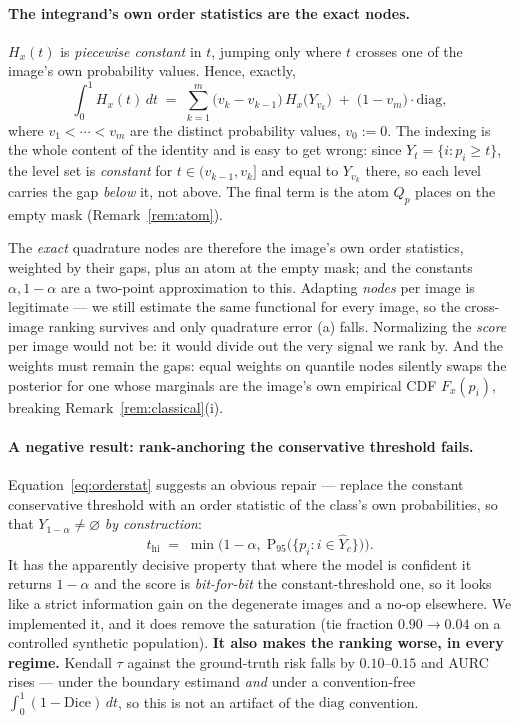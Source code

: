 \documentclass[11pt]{article}
\theoremstyle{remark}
\newcommand{\Yhat}{\widehat{Y}}
\newcommand{\Yhi}{Y_{1-\alpha}}
\newcommand{\Dice}{\mathrm{Dice}}
\newcommand{\diag}{\mathrm{diag}}
\begin{document}
\paragraph{The integrand's own order statistics are the exact nodes.} $H_x(t)$ is
\emph{piecewise constant} in $t$, jumping only where $t$ crosses one of the image's
own probability values. Hence, exactly,
\begin{equation}\label{eq:orderstat}
\int_0^1 H_x(t)\,dt \;=\; \sum_{k=1}^{m} \big(v_k - v_{k-1}\big)\, H_x\big(Y_{v_k}\big)
\;+\; \big(1 - v_m\big)\cdot \diag,
\end{equation}
where $v_1 < \cdots < v_m$ are the distinct probability values, $v_0 := 0$. The
indexing is the whole content of the identity and is easy to get wrong: since
$Y_t = \{i : p_i \ge t\}$, the level set is \emph{constant} for
$t \in (v_{k-1}, v_k]$ and equal to $Y_{v_k}$ there, so each level carries the gap
\emph{below} it, not above. The final term is the atom $Q_p$ places on the empty mask
(Remark~\ref{rem:atom}).

The \emph{exact} quadrature nodes are therefore the image's own order statistics,
weighted by their gaps, plus an atom at the empty mask; and the constants
$\alpha, 1-\alpha$ are a two-point approximation to this. Adapting \emph{nodes} per
image is legitimate --- we still estimate the same
functional for every image, so the cross-image ranking survives and only quadrature
error (a) falls. Normalizing the \emph{score} per image would not be: it would divide
out the very signal we rank by. And the weights must remain the gaps: equal weights on
quantile nodes silently swaps the posterior for one whose marginals are the image's
own empirical CDF $F_x(p_i)$, breaking Remark~\ref{rem:classical}(i).

\paragraph{A negative result: rank-anchoring the conservative threshold fails.}
Equation~\eqref{eq:orderstat} suggests an obvious repair --- replace the constant
conservative threshold with an order statistic of the class's own probabilities, so
that $\Yhi\ne\varnothing$ \emph{by construction}:
\begin{equation}\label{eq:rankanchor}
t_{\mathrm{hi}} \;=\; \min\!\Big(1-\alpha,\; \mathrm{P}_{95}\big(\{p_i : i \in \Yhat_c\}\big)\Big).
\end{equation}
It has the apparently decisive property that where the model is confident it returns
$1-\alpha$ and the score is \emph{bit-for-bit} the constant-threshold one, so it
looks like a strict information gain on the degenerate images and a no-op elsewhere.
We implemented it, and it does remove the saturation (tie fraction $0.90\to0.04$ on
a controlled synthetic population). \textbf{It also makes the ranking worse, in every
regime.} Kendall $\tau$ against the ground-truth risk falls by $0.10$--$0.15$ and
AURC rises --- under the boundary estimand \emph{and} under a convention-free
$\int_0^1 (1-\Dice)\,dt$, so this is not an artifact of the $\diag$ convention.
\end{document}
